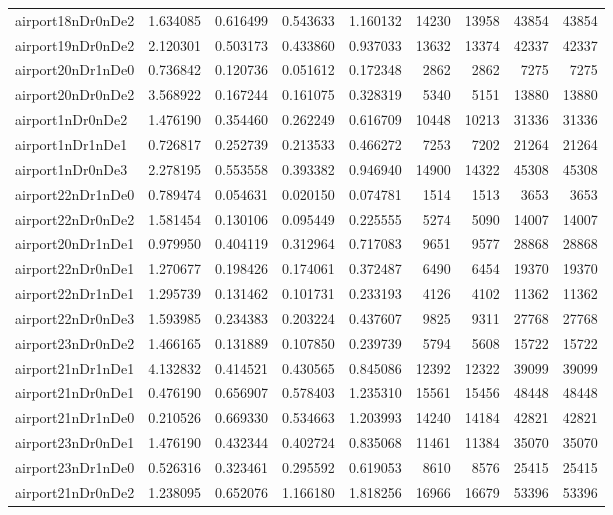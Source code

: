 \begin{longtable}{|l|r|r|r|r|r|r|r|r|}
airport18nDr0nDe2 & 1.634085 & 0.616499 & 0.543633 & 1.160132 & 14230 & 13958 & 43854 & 43854 \\
airport19nDr0nDe2 & 2.120301 & 0.503173 & 0.433860 & 0.937033 & 13632 & 13374 & 42337 & 42337 \\
airport20nDr1nDe0 & 0.736842 & 0.120736 & 0.051612 & 0.172348 & 2862 & 2862 & 7275 & 7275 \\
airport20nDr0nDe2 & 3.568922 & 0.167244 & 0.161075 & 0.328319 & 5340 & 5151 & 13880 & 13880 \\
airport1nDr0nDe2 & 1.476190 & 0.354460 & 0.262249 & 0.616709 & 10448 & 10213 & 31336 & 31336 \\
airport1nDr1nDe1 & 0.726817 & 0.252739 & 0.213533 & 0.466272 & 7253 & 7202 & 21264 & 21264 \\
airport1nDr0nDe3 & 2.278195 & 0.553558 & 0.393382 & 0.946940 & 14900 & 14322 & 45308 & 45308 \\
airport22nDr1nDe0 & 0.789474 & 0.054631 & 0.020150 & 0.074781 & 1514 & 1513 & 3653 & 3653 \\
airport22nDr0nDe2 & 1.581454 & 0.130106 & 0.095449 & 0.225555 & 5274 & 5090 & 14007 & 14007 \\
airport20nDr1nDe1 & 0.979950 & 0.404119 & 0.312964 & 0.717083 & 9651 & 9577 & 28868 & 28868 \\
airport22nDr0nDe1 & 1.270677 & 0.198426 & 0.174061 & 0.372487 & 6490 & 6454 & 19370 & 19370 \\
airport22nDr1nDe1 & 1.295739 & 0.131462 & 0.101731 & 0.233193 & 4126 & 4102 & 11362 & 11362 \\
airport22nDr0nDe3 & 1.593985 & 0.234383 & 0.203224 & 0.437607 & 9825 & 9311 & 27768 & 27768 \\
airport23nDr0nDe2 & 1.466165 & 0.131889 & 0.107850 & 0.239739 & 5794 & 5608 & 15722 & 15722 \\
airport21nDr1nDe1 & 4.132832 & 0.414521 & 0.430565 & 0.845086 & 12392 & 12322 & 39099 & 39099 \\
airport21nDr0nDe1 & 0.476190 & 0.656907 & 0.578403 & 1.235310 & 15561 & 15456 & 48448 & 48448 \\
airport21nDr1nDe0 & 0.210526 & 0.669330 & 0.534663 & 1.203993 & 14240 & 14184 & 42821 & 42821 \\
airport23nDr0nDe1 & 1.476190 & 0.432344 & 0.402724 & 0.835068 & 11461 & 11384 & 35070 & 35070 \\
airport23nDr1nDe0 & 0.526316 & 0.323461 & 0.295592 & 0.619053 & 8610 & 8576 & 25415 & 25415 \\
airport21nDr0nDe2 & 1.238095 & 0.652076 & 1.166180 & 1.818256 & 16966 & 16679 & 53396 & 53396 \\

\end{longtable}
